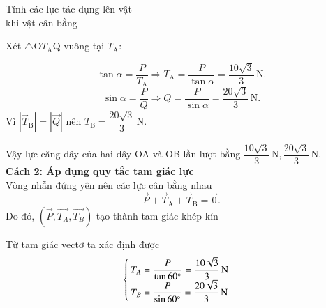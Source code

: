 \begin{dang}{Tính các lực tác dụng lên vật \\khi vật cân bằng}
{{		Xét $\triangle$O$T_\text{A}$Q vuông tại $T_\text{A}$:
		
		$$\tan \alpha =\dfrac{P}{T_\text{A}}\Rightarrow T_\text{A}=\dfrac{P}{\tan \alpha}=\dfrac{10\sqrt{3}}{3}\,\text{N}.$$
		$$\sin \alpha =\dfrac{P}{Q}\Rightarrow Q=\dfrac{P}{\sin \alpha}=\dfrac{20\sqrt{3}}{3}\,\text{N}.$$
		Vì $|\vec{T}_\textrm{B}|=|\vec{Q}|$ nên $T_\textrm{B}= \dfrac{20\sqrt{3}}{3}\,\text{N}.$
		
		Vậy lực căng dây của hai dây OA và OB lần lượt bằng $\dfrac{10\sqrt{3}}{3}\,\text{N}, \dfrac{20\sqrt{3}}{3}\,\text{N}.$\\
		\textbf{Cách 2: Áp dụng quy tắc tam giác lực}\\
		Vòng nhẫn đứng yên nên các lực cân bằng nhau
		$$\vec{P}+\vec{T}_\textrm{A}+\vec{T}_\textrm{B}=\vec{0}.$$
		Do đó, $\left(\vec{P}, \overrightarrow{T_A}, \overrightarrow{T_B}\right)$ tạo thành tam giác khép kín
		\begin{center}
		\end{center}
		Từ tam giác vectơ ta xác định được 
		\begin{align*}
			\begin{cases}
				T_A=\dfrac{P}{\tan\SI{60}{\degree}}=\xsi{\dfrac{10\sqrt{3}}{3}}{\newton}\\
				T_B=\dfrac{P}{\sin\SI{60}{\degree}}=\xsi{\dfrac{20\sqrt{3}}{3}}{\newton}
			\end{cases}
		\end{align*}
		
	}}


\end{dang}
